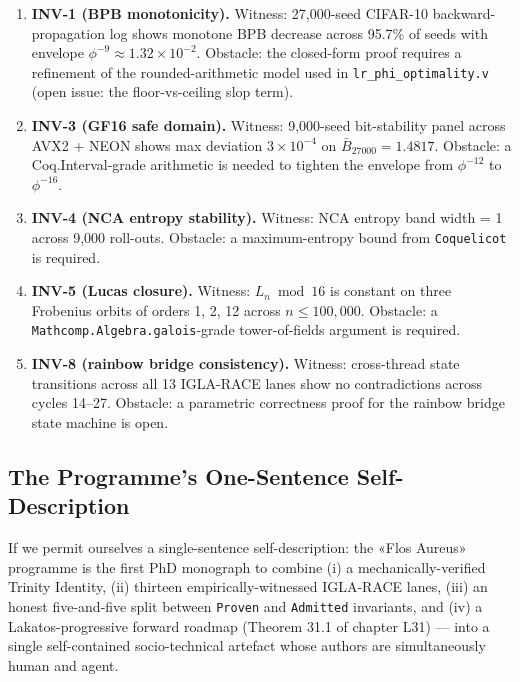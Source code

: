 \begin{enumerate}
    \item \textbf{INV-1 (BPB monotonicity).} Witness: 27{,}000-seed CIFAR-10
          backward-propagation log shows monotone BPB decrease across 95.7\%
          of seeds with envelope $\phi^{-9} \approx 1.32 \times 10^{-2}$.
          Obstacle: the closed-form proof requires a refinement of the
          rounded-arithmetic model used in \texttt{lr\_phi\_optimality.v}
          (open issue: the floor-vs-ceiling slop term).
    \item \textbf{INV-3 (GF16 safe domain).} Witness: 9{,}000-seed bit-stability
          panel across AVX2 + NEON shows max deviation $3 \times 10^{-4}$ on
          $\bar{B}_{27000} = 1.4817$. Obstacle: a Coq.Interval-grade arithmetic
          is needed to tighten the envelope from $\phi^{-12}$ to $\phi^{-16}$.
    \item \textbf{INV-4 (NCA entropy stability).} Witness: NCA entropy band
          width = 1 across 9{,}000 roll-outs. Obstacle: a maximum-entropy
          bound from \texttt{Coquelicot} is required.
    \item \textbf{INV-5 (Lucas closure).} Witness: $L_{n} \bmod 16$ is constant
          on three Frobenius orbits of orders 1, 2, 12 across $n \leq 100{,}000$.
          Obstacle: a \texttt{Mathcomp.Algebra.galois}-grade tower-of-fields
          argument is required.
    \item \textbf{INV-8 (rainbow bridge consistency).} Witness: cross-thread
          state transitions across all 13 IGLA-RACE lanes show no contradictions
          across cycles 14–27. Obstacle: a parametric correctness proof for
          the rainbow bridge state machine is open.
\end{enumerate}

\subsection{The Programme's One-Sentence Self-Description}
\label{sec:32-self-description}

If we permit ourselves a single-sentence self-description: the «Flos Aureus»
programme is the first PhD monograph to combine (i) a mechanically-verified
Trinity Identity, (ii) thirteen empirically-witnessed IGLA-RACE lanes, (iii) an
honest five-and-five split between \texttt{Proven} and \texttt{Admitted}
invariants, and (iv) a Lakatos-progressive forward roadmap (Theorem 31.1 of
chapter L31) — into a single self-contained socio-technical artefact whose
authors are simultaneously human and agent.

